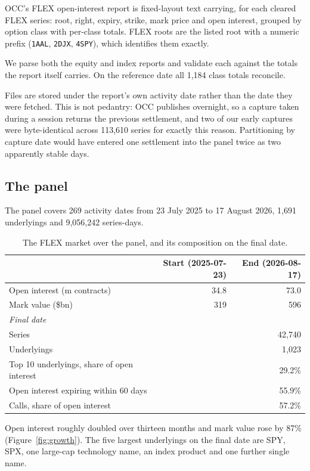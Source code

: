 \documentclass[11pt]{article}
\begin{document}
OCC's FLEX open-interest report is fixed-layout text carrying, for each cleared FLEX
series: root, right, expiry, strike, mark price and open interest, grouped by option
class with per-class totals. FLEX roots are the listed root with a numeric prefix
(\texttt{1AAL}, \texttt{2DJX}, \texttt{4SPY}), which identifies them exactly.

We parse both the equity and index reports and validate each against the totals the
report itself carries. On the reference date all 1,184 class totals reconcile.

Files are stored under the report's own activity date rather than the date they were
fetched. This is not pedantry: OCC publishes overnight, so a capture taken during a
session returns the previous settlement, and two of our early captures were
byte-identical across 113,610 series for exactly this reason. Partitioning by capture
date would have entered one settlement into the panel twice as two apparently stable
days.

\subsection{The panel}

The panel covers 269 activity dates from 23 July 2025 to 17 August 2026, 1,691
underlyings and 9,056,242 series-days.

\begin{table}[t]
\centering
\caption{The FLEX market over the panel, and its composition on the final date.}
\label{tab:panel}
\begin{tabular}{lrr}
\toprule
& Start (2025-07-23) & End (2026-08-17) \\
\midrule
Open interest (m contracts) & 34.8 & 73.0 \\
Mark value (\$bn) & 319 & 596 \\
\midrule
\multicolumn{3}{l}{\emph{Final date}} \\
Series & & 42,740 \\
Underlyings & & 1,023 \\
Top 10 underlyings, share of open interest & & 29.2\% \\
Open interest expiring within 60 days & & 55.9\% \\
Calls, share of open interest & & 57.2\% \\
\bottomrule
\end{tabular}
\end{table}

Open interest roughly doubled over thirteen months and mark value rose by 87\%
(Figure~\ref{fig:growth}). The five largest underlyings on the final date are SPY, SPX,
one large-cap technology name, an index product and one further single name.
\end{document}
